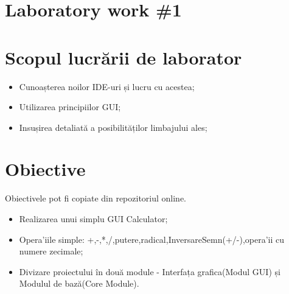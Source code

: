 \section*{Laboratory work \#1}

\section{Scopul lucrării de laborator}
\begin{itemize}
\item  Cunoașterea noilor IDE-uri și lucru cu acestea;
\item  Utilizarea principiilor GUI;
\item  Insușirea detaliată a posibilităților limbajului ales;
\end{itemize}
\section{Obiective}

Obiectivele pot fi copiate din repozitoriul online.

\begin{itemize}
\item Realizarea unui simplu GUI Calculator;
\item Opera'iile simple: +,-,*,/,putere,radical,InversareSemn(+/-),opera'ii cu numere zecimale;
\item Divizare proiectului în două module - Interfața grafica(Modul GUI) și Modulul de bază(Core Module).
\end{itemize}

\clearpage